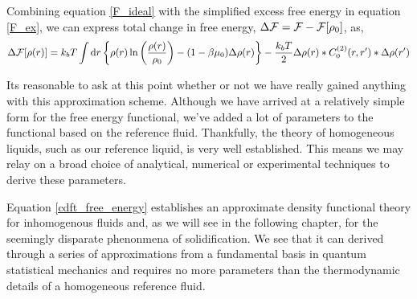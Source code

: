 %
Combining equation \ref{F_ideal} with the simplified excess free energy in
equation \ref{F_ex}, we can express total change in free energy, $\Delta \mathcal{F} =
\mathcal{F} - \mathcal{F}[\rho_0]$, as,
%
\begin{equation}
    \label{cdft_free_energy}
    \Delta \mathcal{F} [\rho(r)] 
        = k_b T\int \mathrm{d}r 
            \left\lbrace \rho(r) \ln\left(\frac{\rho(r)}{\rho_0} \right) 
            - (1-\beta\mu_0) \Delta \rho(r)\right\rbrace 
        - \frac{k_b T}{2}\Delta \rho(r) \ast C_0^{(2)}(r, r^\prime) 
            \ast \Delta \rho(r^\prime)
\end{equation}

Its reasonable to ask at this point whether or not we have really gained
anything with this approximation scheme.  Although we have arrived at a
relatively simple form for the free energy functional, we've added a lot of
parameters to the functional based on the reference fluid.  Thankfully, the
theory of homogeneous liquids, such as our reference liquid, is very well
established.  This means we may relay on a broad choice of analytical,
numerical or experimental techniques to derive these parameters.

Equation \ref{cdft_free_energy} establishes an approximate density functional
theory for inhomogenous fluids and, as we will see in the following chapter,
for the seemingly disparate phenonmena of solidification. We see that it can
derived through a series of approximations from a fundamental basis in quantum
statistical mechanics and requires no more parameters than the thermodynamic
details of a homogeneous reference fluid.
